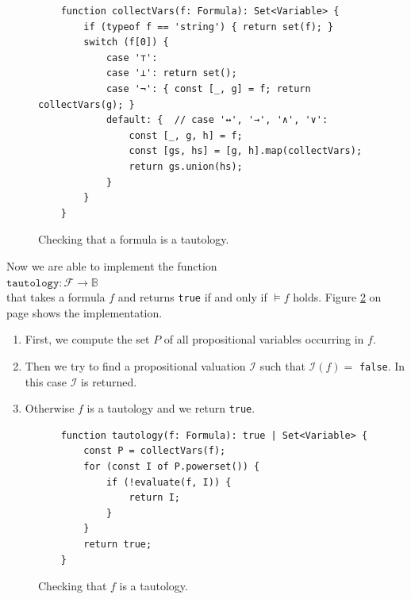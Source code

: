 \begin{figure}[!ht]
  \centering
\begin{verbatim}
    function collectVars(f: Formula): Set<Variable> {
        if (typeof f == 'string') { return set(f); }
        switch (f[0]) {
            case '⊤':
            case '⊥': return set();
            case '¬': { const [_, g] = f; return collectVars(g); }
            default: {  // case '↔', '→', '∧', '∨':
                const [_, g, h] = f;
                const [gs, hs] = [g, h].map(collectVars);
                return gs.union(hs);
            }
        }
    }
\end{verbatim}
\vspace*{-0.3cm}
  \caption{Checking that a formula is a tautology.}
  \label{fig:tautology.py-collectVars}
\end{figure}

Now we are able to implement the function 
\\[0.2cm]
\hspace*{1.3cm}
$\mathtt{tautology}: \mathcal{F} \rightarrow \mathbb{B}$
\\[0.2cm]
that takes a formula $f$ and returns \texttt{true} if and only if $\models f$ holds.
Figure \ref{fig:tautology.py} on page \pageref{fig:tautology.py}
shows the implementation.
\begin{enumerate}
\item First, we compute the set $P$ of all propositional variables occurring in $f$.
\item Then we try to find a propositional valuation $\mathcal{I}$ such that $\mathcal{I}(f) =$
      \texttt{false}.  In this case $\mathcal{I}$ is returned. 
\item Otherwise $f$ is a tautology and we return \texttt{true}.
\end{enumerate}

\begin{figure}[!ht]
  \centering
\begin{verbatim}
    function tautology(f: Formula): true | Set<Variable> {
        const P = collectVars(f);
        for (const I of P.powerset()) {
            if (!evaluate(f, I)) {
                return I;
            }
        }
        return true;
    }                
\end{verbatim}
\vspace*{-0.3cm}
  \caption{Checking that $f$ is a tautology.}
  \label{fig:tautology.py}
\end{figure}


